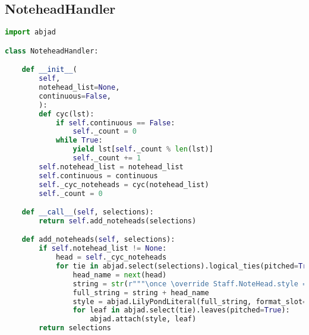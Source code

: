 \subsection{NoteheadHandler}
\singlespace
\begin{lstlisting}[language=Python, caption=NoteheadHandler]
import abjad

class NoteheadHandler:

    def __init__(
        self,
        notehead_list=None,
        continuous=False,
        ):
        def cyc(lst):
            if self.continuous == False:
                self._count = 0
            while True:
                yield lst[self._count % len(lst)]
                self._count += 1
        self.notehead_list = notehead_list
        self.continuous = continuous
        self._cyc_noteheads = cyc(notehead_list)
        self._count = 0

    def __call__(self, selections):
        return self.add_noteheads(selections)

    def add_noteheads(self, selections):
        if self.notehead_list != None:
            head = self._cyc_noteheads
            for tie in abjad.select(selections).logical_ties(pitched=True):
                head_name = next(head)
                string = str(r"""\once \override Staff.NoteHead.style = #'""")
                full_string = string + head_name
                style = abjad.LilyPondLiteral(full_string, format_slot='before',)
                for leaf in abjad.select(tie).leaves(pitched=True):
                    abjad.attach(style, leaf)
        return selections
\end{lstlisting}
\doublespace

